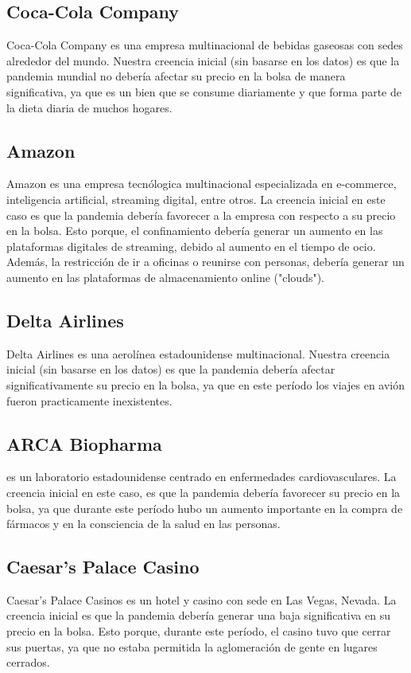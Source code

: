 \documentclass{article}
\begin{document}
\subsection{Coca-Cola Company} Coca-Cola Company es una empresa multinacional de bebidas gaseosas con sedes alrededor del mundo. Nuestra creencia inicial (sin basarse en los datos) es que la pandemia mundial no debería afectar su precio en la bolsa de manera significativa, ya que es un bien que se consume diariamente y que forma parte de la dieta diaria de muchos hogares. 
\subsection{Amazon} Amazon es una empresa tecnólogica multinacional especializada en e-commerce, inteligencia artificial, streaming digital, entre otros. La creencia inicial en este caso es que la pandemia debería favorecer a la empresa con respecto a su precio en la bolsa. Esto porque, el confinamiento debería generar un aumento en las plataformas digitales de streaming, debido al aumento en el tiempo de ocio. Además, la restricción de ir a oficinas o reunirse con personas, debería generar un aumento en las plataformas de almacenamiento online ("clouds").
\subsection{Delta Airlines} Delta Airlines es una aerolínea estadounidense multinacional. Nuestra creencia inicial (sin basarse en los datos) es que la pandemia debería afectar significativamente su precio en la bolsa, ya que en este período los viajes en avión fueron practicamente inexistentes. 
\subsection{ARCA Biopharma} es un laboratorio estadounidense centrado en enfermedades cardiovasculares. La creencia inicial en este caso, es que la pandemia debería favorecer su precio en la bolsa, ya que durante este período hubo un aumento importante en la compra de fármacos y en la consciencia de la salud en las personas.
\subsection{Caesar's Palace Casino} Caesar's Palace Casinos es un hotel y casino con sede en Las Vegas, Nevada. La creencia inicial es que la pandemia debería generar una baja significativa en su precio en la bolsa. Esto porque, durante este período, el casino tuvo que cerrar sus puertas, ya que no estaba permitida la aglomeración de gente en lugares cerrados. 
\end{document}

